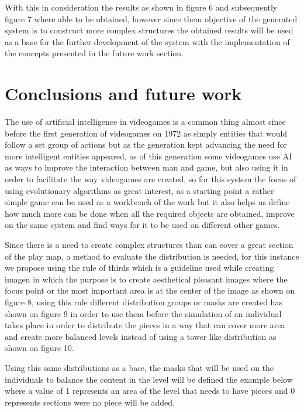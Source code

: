 \documentclass[graybox]{svmult}
\begin{document}
With this in consideration the results as shown in figure 6 and subsequently figure 7 where able to be obtained, however since them objective of the generated system is to construct more complex structures the obtained results will be used as a base for the further development of the system with the implementation of the concepts presented in the future work section.

\section{Conclusions and future work}

The use of artificial intelligence in videogames is a common thing almost since before the first generation of videogames on 1972 as simply entities that would follow a set group of actions but as the generation kept advancing the need for more intelligent entities appeared, as of this generation some videogames use AI as ways to improve the interaction between man and game, but also using it in order to facilitate the way videogames are created, so for this system the focus of using evolutionary algorithms as great interest, as a starting point a rather simple game can be used as a workbench of the work but it also helps us define how much more can be done when all the required objects are obtained, improve on the same system and find ways for it to be used on different other games.

Since there is a need to create complex structures than can cover a great section of the play map, a method to evaluate the distribution is needed, for this instance we propose using the rule of thirds \cite{DarrenRowse} which is a guideline used while creating imagen in which the purpose is to create aesthetical pleasant images where the focus point or the most important area is at the center of the image as shown on figure 8, using this rule different distribution groups or masks are created has shown on figure 9 in order to use them before the simulation of an individual takes place in order to distribute the pieces in a way that can cover more area and create more balanced levels instead of using a tower like distribution as shown on figure 10.

Using this same distributions as a base, the masks that will be used on the individuals to balance the content in the level will be defined the example below where a value of 1 represents an area of the level that needs to have pieces and 0 represents sections were no piece will be added.
\end{document}
